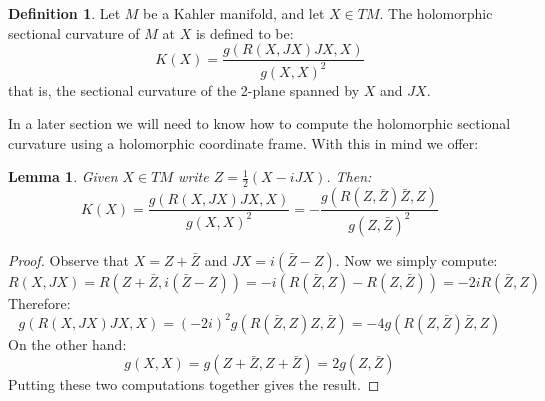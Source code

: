 \documentclass[11pt]{amsart}
\newtheorem{lem}[subsection]{Lemma}
\theoremstyle{definition}
\newtheorem{definition}[subsection]{Definition}
\begin{document}
\begin{definition} Let $M$ be a Kahler manifold, and let $X \in TM$. The holomorphic sectional curvature of $M$ at $X$ is defined to be:
$$ K(X) = \frac{ g( R(X, JX) JX, X) }{ g( X, X )^2 } $$
that is, the sectional curvature of the 2-plane spanned by $X$ and $JX$.
\end{definition}
%
In a later section we will need to know how to compute the holomorphic sectional curvature using a holomorphic coordinate frame.  With this in mind we offer:
%
\begin{lem} Given $X \in TM$ write $Z = \frac{1}{2}( X - i JX )$.  Then:
$$ K(X) = \frac{ g( R(X, JX) JX, X) }{ g( X, X )^2 } = - \frac{ g( R(Z, \bar{Z}) \bar{Z}, Z) }{g( Z, \bar{Z} )^2 } $$
\end{lem}
%
\begin{proof} Observe that $X = Z + \bar{Z}$ and $JX = i( \bar{Z} - Z )$.  Now we simply compute:
%
$$ R(X, JX) = R( Z + \bar{Z}, i( \bar{Z} - Z ) ) = - i( R( \bar{Z}, Z ) - R( Z, \bar{Z} ) ) = - 2i R( \bar{Z}, Z )$$
%
Therefore:
%
$$ g( R(X, JX) JX, X ) = (-2i)^2 g( R(\bar{Z}, Z) Z, \bar{Z} ) = -4 g( R(Z, \bar{Z}) \bar{Z}, Z ) $$
%
On the other hand:
%
$$ g(X, X) = g(Z + \bar{Z}, Z + \bar{Z}) = 2 g(Z, \bar{Z}) $$
%
Putting these two computations together gives the result.
%
\end{proof}
%
\end{document}
